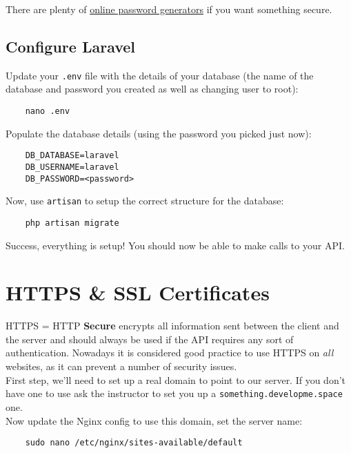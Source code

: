 There are plenty of \href{https://generatepasswords.org}{online password generators} if you want something secure.

\subsection{Configure Laravel}

Update your \texttt{.env} file with the details of your database (the name of the database and password you created as well as changing user to root):

\begin{verbatim}
    nano .env
\end{verbatim}

Populate the database details (using the password you picked just now):

\begin{verbatim}
    DB_DATABASE=laravel
    DB_USERNAME=laravel
    DB_PASSWORD=<password>
\end{verbatim}

Now, use \texttt{artisan} to setup the correct structure for the database:

\begin{verbatim}
    php artisan migrate
\end{verbatim}

Success, everything is setup! You should now be able to make calls to your API.


\section{HTTPS \& SSL Certificates}

HTTPS = HTTP \textbf{Secure} encrypts all information sent between the client and the server and should always be used if the API requires any sort of authentication. Nowadays it is considered good practice to use HTTPS on \textit{all} websites, as it can prevent a number of security issues.
\\

First step, we'll need to set up a real domain to point to our server. If you don't have one to use ask the instructor to set you up a \texttt{something.developme.space} one.
\\

Now update the Nginx config to use this domain, set the server name:

\begin{verbatim}
    sudo nano /etc/nginx/sites-available/default
\end{verbatim}

